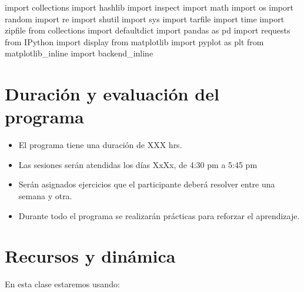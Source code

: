 \documentclass[
]{book}
\newenvironment{Shaded}{\begin{snugshade}}{\end{snugshade}}
\newcommand{\ImportTok}[1]{#1}
\newcommand{\NormalTok}[1]{#1}
\begin{document}
\begin{Shaded}
\begin{Highlighting}[]
\ImportTok{import}\NormalTok{ collections}
\ImportTok{import}\NormalTok{ hashlib}
\ImportTok{import}\NormalTok{ inspect}
\ImportTok{import}\NormalTok{ math}
\ImportTok{import}\NormalTok{ os}
\ImportTok{import}\NormalTok{ random}
\ImportTok{import}\NormalTok{ re}
\ImportTok{import}\NormalTok{ shutil}
\ImportTok{import}\NormalTok{ sys}
\ImportTok{import}\NormalTok{ tarfile}
\ImportTok{import}\NormalTok{ time}
\ImportTok{import}\NormalTok{ zipfile}
\ImportTok{from}\NormalTok{ collections }\ImportTok{import}\NormalTok{ defaultdict}
\ImportTok{import}\NormalTok{ pandas }\ImportTok{as}\NormalTok{ pd}
\ImportTok{import}\NormalTok{ requests}
\ImportTok{from}\NormalTok{ IPython }\ImportTok{import}\NormalTok{ display}
\ImportTok{from}\NormalTok{ matplotlib }\ImportTok{import}\NormalTok{ pyplot }\ImportTok{as}\NormalTok{ plt}
\ImportTok{from}\NormalTok{ matplotlib\_inline }\ImportTok{import}\NormalTok{ backend\_inline}
\end{Highlighting}
\end{Shaded}

\hypertarget{duraciuxf3n-y-evaluaciuxf3n-del-programa}{%
\section*{Duración y evaluación del programa}\label{duraciuxf3n-y-evaluaciuxf3n-del-programa}}

\begin{itemize}
\item
  El programa tiene una duración de XXX hrs.
\item
  Las sesiones serán atendidas los días XxXx, de 4:30 pm a 5:45 pm
\item
  Serán asignados ejercicios que el participante deberá resolver entre una semana y otra.
\item
  Durante todo el programa se realizarán prácticas para reforzar el aprendizaje.
\end{itemize}

\hypertarget{recursos-y-dinuxe1mica}{%
\section*{Recursos y dinámica}\label{recursos-y-dinuxe1mica}}

En esta clase estaremos usando:
\end{document}
